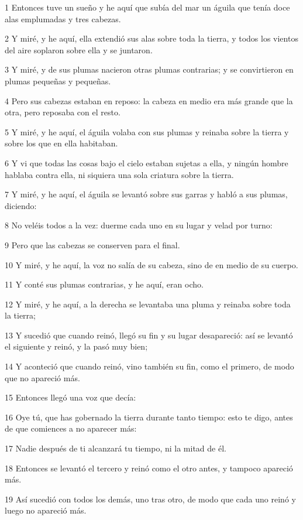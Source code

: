 \par 1 Entonces tuve un sueño y he aquí que subía del mar un águila que tenía doce alas emplumadas y tres cabezas.
\par 2 Y miré, y he aquí, ella extendió sus alas sobre toda la tierra, y todos los vientos del aire soplaron sobre ella y se juntaron.
\par 3 Y miré, y de sus plumas nacieron otras plumas contrarias; y se convirtieron en plumas pequeñas y pequeñas.
\par 4 Pero sus cabezas estaban en reposo: la cabeza en medio era más grande que la otra, pero reposaba con el resto.
\par 5 Y miré, y he aquí, el águila volaba con sus plumas y reinaba sobre la tierra y sobre los que en ella habitaban.
\par 6 Y vi que todas las cosas bajo el cielo estaban sujetas a ella, y ningún hombre hablaba contra ella, ni siquiera una sola criatura sobre la tierra.
\par 7 Y miré, y he aquí, el águila se levantó sobre sus garras y habló a sus plumas, diciendo:
\par 8 No veléis todos a la vez: duerme cada uno en su lugar y velad por turno:
\par 9 Pero que las cabezas se conserven para el final.
\par 10 Y miré, y he aquí, la voz no salía de su cabeza, sino de en medio de su cuerpo.
\par 11 Y conté sus plumas contrarias, y he aquí, eran ocho.
\par 12 Y miré, y he aquí, a la derecha se levantaba una pluma y reinaba sobre toda la tierra;
\par 13 Y sucedió que cuando reinó, llegó su fin y su lugar desapareció: así se levantó el siguiente y reinó, y la pasó muy bien;
\par 14 Y aconteció que cuando reinó, vino también su fin, como el primero, de modo que no apareció más.
\par 15 Entonces llegó una voz que decía:
\par 16 Oye tú, que has gobernado la tierra durante tanto tiempo: esto te digo, antes de que comiences a no aparecer más:
\par 17 Nadie después de ti alcanzará tu tiempo, ni la mitad de él.
\par 18 Entonces se levantó el tercero y reinó como el otro antes, y tampoco apareció más.
\par 19 Así sucedió con todos los demás, uno tras otro, de modo que cada uno reinó y luego no apareció más.
